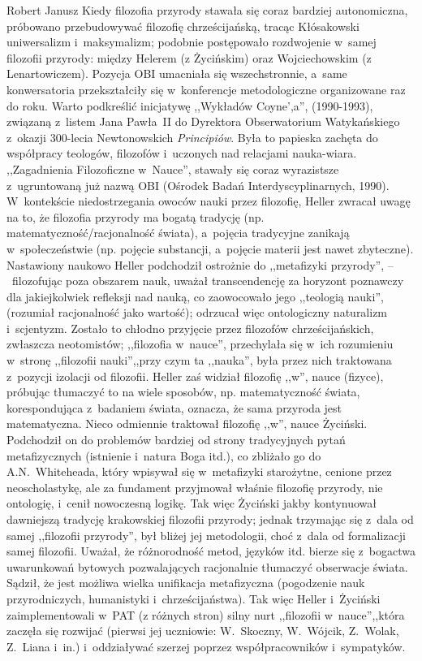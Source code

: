 \begin{newrevplenv}{Robert Janusz}
 Kiedy filozofia przyrody stawała się coraz bardziej autonomiczna, próbowano przebudowywać filozofię chrześcijańską, tracąc Kłósakowski uniwersalizm i~maksymalizm; podobnie postępowało rozdwojenie w~samej filozofii przyrody: między Helerem (z Życińskim) oraz Wojciechowskim (z Lenartowiczem). Pozycja OBI umacniała się wszechstronnie, a~same konwersatoria przekształciły się w~konferencje metodologiczne organizowane raz do roku. Warto podkreślić inicjatywę ,,Wykładów Coyne',a'', (1990-1993), związaną z~listem Jana Pawła~II do Dyrektora Obserwatorium Watykańskiego z~okazji 300-lecia Newtonowskich \textit{Principiów}. Była to papieska zachęta do współpracy teologów, filozofów i~uczonych nad relacjami nauka-wiara. ,,Zagadnienia Filozoficzne w~Nauce'', stawały się coraz wyrazistsze z~ugruntowaną już nazwą OBI (Ośrodek Badań Interdyscyplinarnych, 1990). W~kontekście niedostrzegania owoców nauki przez filozofię, Heller zwracał uwagę na to, że filozofia przyrody ma bogatą tradycję (np. matematyczność/racjonalność świata), a~pojęcia tradycyjne zanikają w~społeczeństwie (np. pojęcie substancji, a~pojęcie materii jest nawet zbyteczne). Nastawiony naukowo Heller podchodził ostrożnie do ,,metafizyki przyrody'', --~filozofując poza obszarem nauk, uważał transcendencję za horyzont poznawczy dla jakiejkolwiek refleksji nad nauką, co zaowocowało jego ,,teologią nauki'', (rozumiał racjonalność jako wartość); odrzucał więc ontologiczny naturalizm i~scjentyzm. Zostało to chłodno przyjęcie przez filozofów chrześcijańskich, zwłaszcza neotomistów; ,,filozofia w~nauce'', przechylała się w~ich rozumieniu w~stronę ,,filozofii nauki'',,przy czym ta ,,nauka'', była przez nich traktowana z~pozycji izolacji od filozofii. Heller zaś widział filozofię ,,w'', nauce (fizyce), próbując tłumaczyć to na wiele sposobów, np. matematyczność świata, korespondująca z~badaniem świata, oznacza, że sama przyroda jest matematyczna. Nieco odmiennie traktował filozofię ,,w'', nauce Życiński. Podchodził on do problemów bardziej od strony tradycyjnych pytań metafizycznych (istnienie i~natura Boga itd.), co zbliżało go do A.N.~Whiteheada, który wpisywał się w~metafizyki starożytne, cenione przez neoscholastykę, ale za fundament przyjmował właśnie filozofię przyrody, nie ontologię, i~cenił nowoczesną logikę. Tak więc Życiński jakby kontynuował dawniejszą tradycję krakowskiej filozofii przyrody; jednak trzymając się z~dala od samej ,,filozofii przyrody'', był bliżej jej metodologii, choć z~dala od formalizacji samej filozofii. Uważał, że różnorodność metod, języków itd. bierze się z~bogactwa uwarunkowań bytowych pozwalających racjonalnie tłumaczyć obserwacje świata. Sądził, że jest możliwa wielka unifikacja metafizyczna (pogodzenie nauk przyrodniczych, humanistyki i~chrześcijaństwa). Tak więc Heller i~Życiński zaimplementowali w~PAT (z różnych stron) silny nurt ,,filozofii w~nauce'',,która zaczęła się rozwijać (pierwsi jej uczniowie: W.~Skoczny, W.~Wójcik, Z.~Wolak, Z.~Liana i~in.) i~oddziaływać szerzej poprzez współpracowników i~sympatyków.


\end{newrevplenv}
